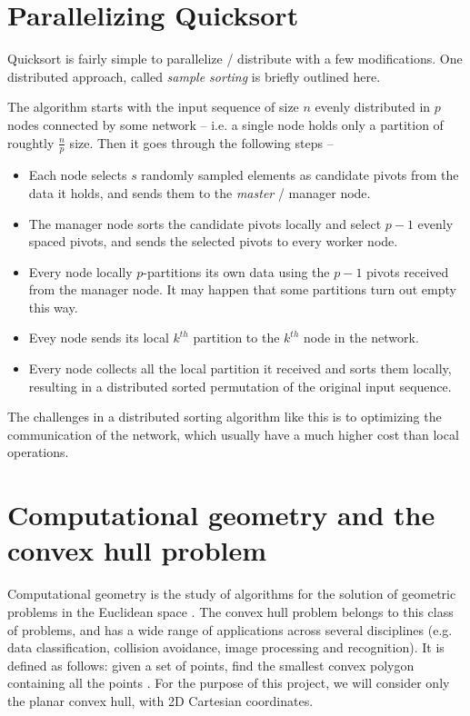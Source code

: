 \documentclass[]{finalproject}
\begin{document}
\section{Parallelizing Quicksort}

Quicksort is fairly simple to parallelize / distribute with a few modifications. One distributed approach, called \textit{sample sorting} is briefly outlined here.

The algorithm starts with the input sequence of size $n$ evenly distributed in $p$ nodes connected by some network -- i.e. a single node holds only a partition of roughtly $\frac{n}{p}$ size. Then it goes through the following steps --
\begin{itemize}
\item Each node selects $s$ randomly sampled elements as candidate pivots from the data it holds, and sends them to the \textit{master} / manager node.
\item The manager node sorts the candidate pivots locally and select $p-1$ evenly spaced pivots, and sends the selected pivots to every worker node.
\item Every node locally $p$-partitions its own data using the $p-1$ pivots received from the manager node. It may happen that some partitions turn out empty this way.
\item Evey node sends its local $k^{th}$ partition to the $k^{th}$ node in the network.
\item Every node collects all the local partition it received and sorts them locally, resulting in a distributed sorted permutation of the original input sequence.
\end{itemize}

The challenges in a distributed sorting algorithm like this is to optimizing the communication of the network, which usually have a much higher cost than local operations.

\section{Computational geometry and the convex hull problem}
Computational geometry is the study of algorithms for the solution of geometric problems in the Euclidean space \cite{jaja2000perspective}.
The convex hull problem belongs to this class of problems, and has a wide range of applications across several disciplines
(e.g. data classification, collision avoidance, image processing and recognition). It is defined as follows:
given a set of points, find the smallest convex polygon containing all the points \cite{geowiki}.
For the purpose of this project, we will consider only the planar convex hull, with 2D Cartesian coordinates.
\end{document}
